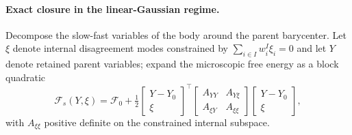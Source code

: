 \documentclass[11pt]{article}
\begin{document}
\paragraph{Exact closure in the linear-Gaussian regime.}
Decompose the slow-fast variables of the body around the parent barycenter. Let $\xi$ denote internal disagreement modes constrained by $\sum_{i \in I} w_i^I \xi_i = 0$ and let $Y$ denote retained parent variables; expand the microscopic free energy as a block quadratic
\begin{equation}
\mathcal{F}_s(Y, \xi) = \mathcal{F}_0 + \tfrac{1}{2}\begin{bmatrix} Y - Y_0 \\ \xi \end{bmatrix}^\top \begin{bmatrix} A_{YY} & A_{Y\xi} \\ A_{\xi Y} & A_{\xi\xi} \end{bmatrix} \begin{bmatrix} Y - Y_0 \\ \xi \end{bmatrix},
\end{equation}
with $A_{\xi\xi}$ positive definite on the constrained internal subspace.
\end{document}
